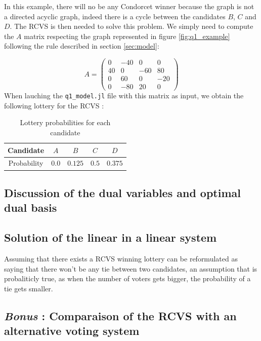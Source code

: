 In this example, there will no be any Condorcet winner because the graph is not a directed acyclic graph, indeed there is a cycle between the candidates $B$, $C$ and $D$.
The RCVS is then needed to solve this problem. We simply need to compute the $A$ matrix respecting the graph represented in figure \ref{fig:q1_example} following the rule described in section \ref{sec:model}:

$$A = \begin{pmatrix}
  0 & -40 & 0 & 0\\
  40 & 0 & -60 & 80\\
  0 & 60 & 0 & -20\\
  0 & -80 & 20 & 0
\end{pmatrix}$$
\newpage
When lauching the \verb|q1_model.jl| file with this matrix as input, we obtain the following lottery for the RCVS :

\begin{table}[!h]
  \centering
  \begin{tabular}{|c|c|c|c|c|}
  \hline
  Candidate   & $A$   & $B$     & $C$   & $D$     \\ \hline
  Probability & $0.0$ & $0.125$ & $0.5$ & $0.375$ \\ \hline
  \end{tabular}
  \caption{Lottery probabilities for each candidate}
  \label{tab:q1_prob}
\end{table}

\subsection{Discussion of the dual variables and optimal dual basis}


\subsection{Solution of the linear in a linear system}
Assuming that there exists a RCVS winning lottery can be reformulated as saying that there won't be any tie between two candidates, an assumption that is probaliticly true, as when the number of voters gets bigger, the probability of a tie gets smaller.

\subsection{\textit{Bonus} : Comparaison of the RCVS with an alternative voting system}